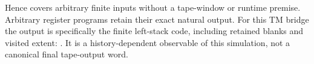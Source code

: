 Hence  covers arbitrary finite
inputs without a tape-window or runtime premise.  Arbitrary register programs
retain their exact natural output.  For this TM bridge the output is specifically
the finite left-stack code, including retained blanks and visited extent:
.  It is a history-dependent observable
of this simulation, not a canonical final tape-output word.
